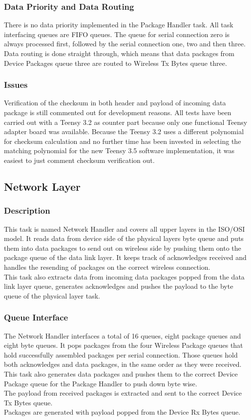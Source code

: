 \subsubsection{Data Priority and Data Routing}
There is no data priority implemented in the Package Handler task. All task interfacing queues are FIFO queues. The queue for serial connection zero is always processed first, followed by the serial connection one, two and then three.\\
Data routing is done straight through, which means that data packages from Device Packages queue three are routed to Wireless Tx Bytes queue three.
\subsubsection{Issues}
Verification of the checksum in both header and payload of incoming data package is still commented out for development reasons. All tests have been carried out with a Teensy 3.2 as counter part because only one functional Teensy adapter board was available. Because the Teensy 3.2 uses a different polynomial for checksum calculation and no further time has been invested in selecting the matching polynomial for the new Teensy 3.5 software implementation, it was easiest to just comment checksum verification out.\\
%
%
\subsection{Network Layer}
\subsubsection{Description}
This task is named Network Handler and covers all upper layers in the ISO/OSI model. It reads data from device side of the physical layers byte queue and puts them into data packages to send out on wireless side by pushing them onto the package queue of the data link layer. It keeps track of acknowledges received and handles the resending of packages on the correct wireless connection.\\
This task also extracts data from incoming data packages popped from the data link layer queue, generates acknowledges and pushes the payload to the byte queue of the physical layer task.
\subsubsection{Queue Interface}
The Network Handler interfaces a total of 16 queues, eight package queues and eight byte queues. It pops packages from the four Wireless Package queues that hold successfully assembled packages per serial connection. Those queues hold both acknowledges and data packages, in the same order as they were received.\\
This task also generates data packages and pushes them to the correct Device Package queue for the Package Handler to push down byte wise.\\
The payload from received packages is extracted and sent to the correct Device Tx Bytes queue.\\
Packages are generated with payload popped from the Device Rx Bytes queue.
